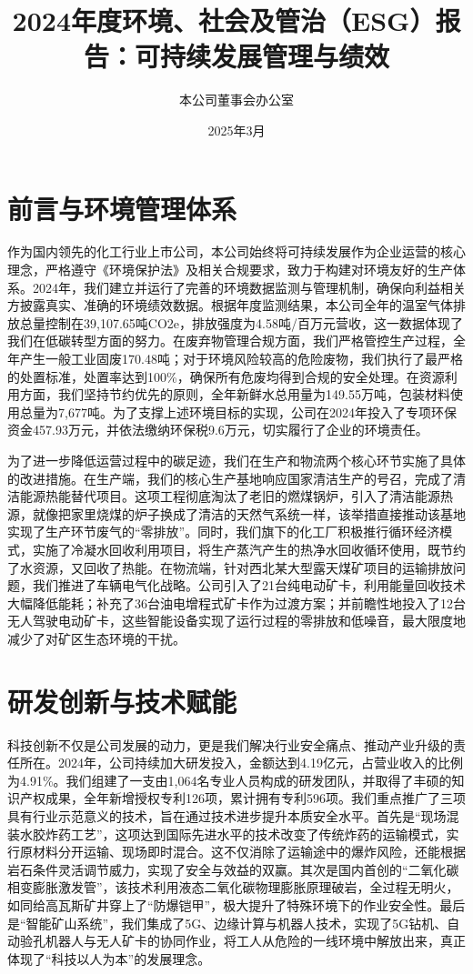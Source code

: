\documentclass[a4paper,12pt]{article}
\title{\textbf{2024年度环境、社会及管治（ESG）报告：可持续发展管理与绩效}}
\author{本公司董事会办公室}
\date{2025年3月}
\begin{document}
\maketitle

\section{前言与环境管理体系}

作为国内领先的化工行业上市公司，本公司始终将可持续发展作为企业运营的核心理念，严格遵守《环境保护法》及相关合规要求，致力于构建对环境友好的生产体系。2024年，我们建立并运行了完善的环境数据监测与管理机制，确保向利益相关方披露真实、准确的环境绩效数据。根据年度监测结果，本公司全年的温室气体排放总量控制在39,107.65吨CO2e，排放强度为4.58吨/百万元营收，这一数据体现了我们在低碳转型方面的努力。在废弃物管理合规方面，我们严格管控生产过程，全年产生一般工业固废170.48吨；对于环境风险较高的危险废物，我们执行了最严格的处置标准，处置率达到100\%，确保所有危废均得到合规的安全处理。在资源利用方面，我们坚持节约优先的原则，全年新鲜水总用量为149.55万吨，包装材料使用总量为7,677吨。为了支撑上述环境目标的实现，公司在2024年投入了专项环保资金457.93万元，并依法缴纳环保税9.6万元，切实履行了企业的环境责任。

为了进一步降低运营过程中的碳足迹，我们在生产和物流两个核心环节实施了具体的改进措施。在生产端，我们的核心生产基地响应国家清洁生产的号召，完成了清洁能源热能替代项目。这项工程彻底淘汰了老旧的燃煤锅炉，引入了清洁能源热源，就像把家里烧煤的炉子换成了清洁的天然气系统一样，该举措直接推动该基地实现了生产环节废气的“零排放”。同时，我们旗下的化工厂积极推行循环经济模式，实施了冷凝水回收利用项目，将生产蒸汽产生的热净水回收循环使用，既节约了水资源，又回收了热能。在物流端，针对西北某大型露天煤矿项目的运输排放问题，我们推进了车辆电气化战略。公司引入了21台纯电动矿卡，利用能量回收技术大幅降低能耗；补充了36台油电增程式矿卡作为过渡方案；并前瞻性地投入了12台无人驾驶电动矿卡，这些智能设备实现了运行过程的零排放和低噪音，最大限度地减少了对矿区生态环境的干扰。

\section{研发创新与技术赋能}

科技创新不仅是公司发展的动力，更是我们解决行业安全痛点、推动产业升级的责任所在。2024年，公司持续加大研发投入，金额达到4.19亿元，占营业收入的比例为4.91\%。我们组建了一支由1,064名专业人员构成的研发团队，并取得了丰硕的知识产权成果，全年新增授权专利126项，累计拥有专利596项。我们重点推广了三项具有行业示范意义的技术，旨在通过技术进步提升本质安全水平。首先是“现场混装水胶炸药工艺”，这项达到国际先进水平的技术改变了传统炸药的运输模式，实行原材料分开运输、现场即时混合。这不仅消除了运输途中的爆炸风险，还能根据岩石条件灵活调节威力，实现了安全与效益的双赢。其次是国内首创的“二氧化碳相变膨胀激发管”，该技术利用液态二氧化碳物理膨胀原理破岩，全过程无明火，如同给高瓦斯矿井穿上了“防爆铠甲”，极大提升了特殊环境下的作业安全性。最后是“智能矿山系统”，我们集成了5G、边缘计算与机器人技术，实现了5G钻机、自动验孔机器人与无人矿卡的协同作业，将工人从危险的一线环境中解放出来，真正体现了“科技以人为本”的发展理念。
\end{document}

